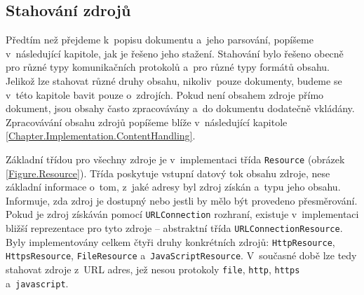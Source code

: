 \subsection{Stahování zdrojů}
\label{Chapter.Implementation.DownloadingResources}

Předtím než přejdeme k~popisu dokumentu a~jeho parsování, popíšeme v~následující kapitole, jak je řešeno jeho stažení. Stahování bylo řešeno obecně pro různé typy komunikačních protokolů a~pro různé typy formátů obsahu. Jelikož lze stahovat různé druhy obsahu, nikoliv~pouze dokumenty, budeme se v~této kapitole bavit pouze o~zdrojích. Pokud není obsahem zdroje přímo dokument, jsou obsahy často zpracovávány a~do dokumentu dodatečně vkládány. Zpracovávání obsahu zdrojů popíšeme blíže v~následující kapitole \ref{Chapter.Implementation.ContentHandling}.

Základní třídou pro všechny zdroje je v~implementaci třída \texttt{Resource} (obrázek \ref{Figure.Resource}). Třída poskytuje vstupní datový tok obsahu zdroje, nese základní informace o~tom, z~jaké adresy byl zdroj získán a~typu jeho obsahu. Informuje, zda zdroj je dostupný nebo jestli by mělo být provedeno přesměrování. Pokud je zdroj získáván pomocí \texttt{URLConnection} rozhraní, existuje v~implementaci bližší reprezentace pro tyto zdroje -- abstraktní třída \texttt{URLConnectionResource}. Byly implementovány celkem čtyři druhy konkrétních zdrojů: \texttt{HttpResource}, \texttt{HttpsResource}, \texttt{FileResource} a~\texttt{JavaScriptResource}. V~současné době lze tedy stahovat zdroje z~URL adres, jež nesou protokoly \texttt{file}, \texttt{http}, \texttt{https} a~\texttt{javascript}.

